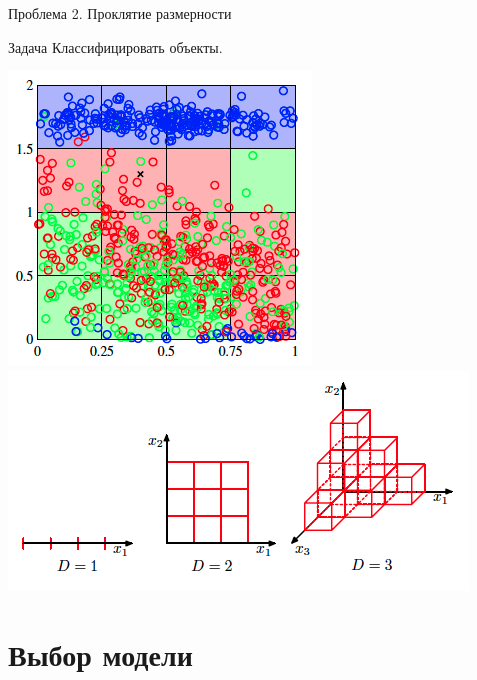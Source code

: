 \documentclass[10pt,a4paper]{beamer}
\begin{document}

\begin{frame}{Проблема 2. Проклятие размерности}

\begin{block}{Задача}
Классифицировать объекты.
\end{block}

\begin{center}
\includegraphics[scale=0.3]{images/pts.png}
\includegraphics[scale=0.4]{images/curse.png}
\end{center}

\end{frame}


\section{Выбор модели}

\end{document}
